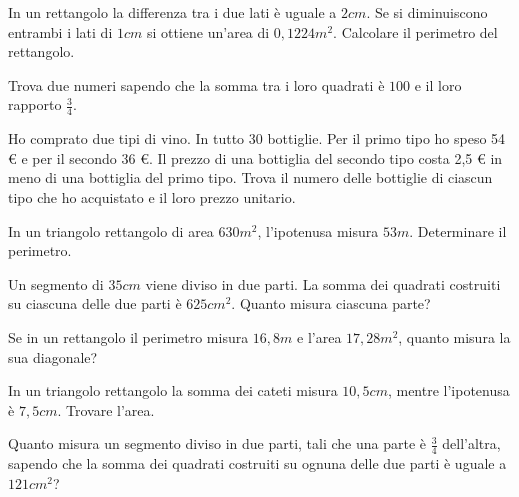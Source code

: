 \begin{multicols}{2}
\begin{esercizio}[\Ast]
 \label{ese:6.56}
In un rettangolo la differenza tra i due lati è uguale a $2\unit{cm}$. Se si diminuiscono entrambi i lati di $ 1\unit{cm} $ si ottiene un'area di $0,1224\unit{m^2}$. Calcolare il perimetro del rettangolo.
\end{esercizio}

\begin{esercizio}[\Ast]
 \label{ese:6.57}
Trova due numeri sapendo che la somma tra i loro quadrati è $ 100 $ e il loro rapporto $ \frac 3 4 $.
\end{esercizio}

\begin{esercizio}[\Ast]
 \label{ese:6.58}
Ho comprato due tipi di vino. In tutto 30 bottiglie. Per il primo tipo ho speso 54 € e per il secondo 36 €. Il prezzo di una bottiglia del secondo tipo costa 2,5 € in meno di una bottiglia del primo tipo. Trova il numero delle bottiglie di ciascun tipo che ho acquistato e il loro prezzo unitario.
\end{esercizio}

\begin{esercizio}[\Ast]
 \label{ese:6.59}
In un triangolo rettangolo di area $630\unit{m^2}$, l'ipotenusa misura $53\unit{m}$. Determinare il perimetro.
\end{esercizio}

\begin{esercizio}[\Ast]
 \label{ese:6.60}
Un segmento di $35\unit{cm}$ viene diviso in due parti. La somma dei quadrati costruiti su ciascuna delle due parti è $625\unit{{cm}^2}$. Quanto misura ciascuna parte?
\end{esercizio}

\begin{esercizio}[\Ast]
 \label{ese:6.61}
Se in un rettangolo il perimetro misura $ 16,8\unit{m} $ e l'area $ 17,28\unit{m^2} $, quanto misura la sua diagonale?
\end{esercizio}

\begin{esercizio}[\Ast]
 \label{ese:6.62}
In un triangolo rettangolo la somma dei cateti misura $ 10,5\unit{cm} $, mentre l'ipotenusa è $ 7,5\unit{cm} $. Trovare l'area.
\end{esercizio}

\begin{esercizio}[\Ast]
 \label{ese:6.63}
Quanto misura un segmento diviso in due parti, tali che una parte è $ \frac 3 4 $ dell'altra, sapendo che la somma dei quadrati costruiti su ognuna delle due parti è uguale a $121\unit{{cm}^2}$?
\end{esercizio}


\end{multicols}
